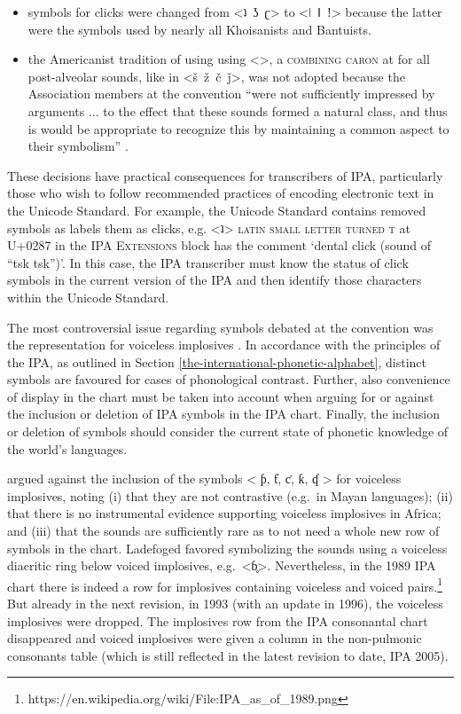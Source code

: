 \begin{itemize}
	\item symbols for clicks were changed from <ʇ~ʖ~ʗ> to <ǀ~ǁ~ǃ>
       because the latter were the symbols used by nearly all Khoisanists and
       Bantuists.
	\item the Americanist tradition of using using <>, a
       \textsc{combining caron} at  for all post-alveolar sounds, like
       in <š~ž~č~ǰ>, was not adopted because the Association members at the
       convention ``were not sufficiently impressed by arguments ... to the
       effect that these sounds formed a natural class, and thus is would be
       appropriate to recognize this by maintaining a common aspect to their
       symbolism'' \citep[62]{Ladefoged1990a}. 
\end{itemize}

\noindent These decisions have practical consequences for transcribers 
of IPA, particularly those who wish to follow recommended practices of 
encoding electronic text in the Unicode Standard. For example, the Unicode 
Standard contains removed symbols as labels them as clicks, e.g. <ʇ> 
\textsc{latin small letter turned t} at U+0287 in the \textsc{IPA Extensions} 
block has the comment `dental click (sound of ``tsk tsk'')'. In this case, 
the IPA transcriber must know the status of click symbols in the current 
version of the IPA and then identify those characters within the Unicode Standard. 

The most controversial issue regarding symbols debated at the convention was the
representation for voiceless implosives \citep[62]{Ladefoged1990a}. In
accordance with the principles of the IPA, as outlined in Section
\ref{the-international-phonetic-alphabet}, distinct symbols are favoured for
cases of phonological contrast. Further, also convenience of display in the chart
must be taken into account when arguing for or against the inclusion or deletion
of IPA symbols in the IPA chart. Finally, the inclusion or deletion of symbols
should consider the current state of phonetic knowledge of the world's
languages.

\citet{Ladefoged1990a} argued against the inclusion of the symbols < ƥ, ƭ, ƈ, ƙ,
ʠ > for voiceless implosives, noting (i) that they are not contrastive (e.g.\ in
Mayan languages); (ii) that there is no instrumental evidence supporting
voiceless implosives in Africa; and (iii) that the sounds are sufficiently rare
as to not need a whole new row of symbols in the chart. Ladefoged favored
symbolizing the sounds using a voiceless diacritic ring below voiced implosives,
e.g.\ <ɓ̥>. Nevertheless, in the 1989 IPA chart there is indeed a row for
implosives containing voiceless and voiced
pairs.\footnote{https://en.wikipedia.org/wiki/File:IPA\_as\_of\_1989.png} But
already in the next revision, in 1993 (with an update in 1996), the voiceless
implosives were dropped. The implosives row from the IPA consonantal chart
disappeared and voiced implosives were given a column in the non-pulmonic
consonants table (which is still reflected in the latest revision to date, IPA
2005).

